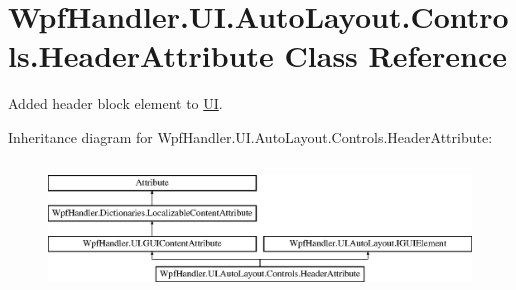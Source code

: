 \hypertarget{class_wpf_handler_1_1_u_i_1_1_auto_layout_1_1_controls_1_1_header_attribute}{}\section{Wpf\+Handler.\+U\+I.\+Auto\+Layout.\+Controls.\+Header\+Attribute Class Reference}
\label{class_wpf_handler_1_1_u_i_1_1_auto_layout_1_1_controls_1_1_header_attribute}


Added header block element to \mbox{\hyperlink{namespace_wpf_handler_1_1_u_i}{UI}}.  


Inheritance diagram for Wpf\+Handler.\+U\+I.\+Auto\+Layout.\+Controls.\+Header\+Attribute\+:\begin{figure}[H]
\begin{center}
\leavevmode
\includegraphics[height=3.544304cm]{d1/d32/class_wpf_handler_1_1_u_i_1_1_auto_layout_1_1_controls_1_1_header_attribute}
\end{center}
\end{figure}
